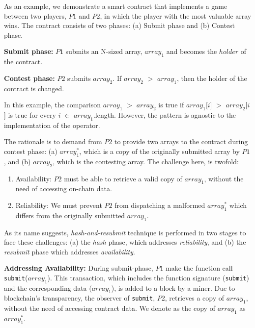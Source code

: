 

As an example, we demonstrate a smart contract that implements a game between
two players, $P1$ and $P2$, in which the player with the most valuable array
wins. The contract consists of two phases: (a) Submit phase and (b) Contest
phase.

\noindent \textbf{Submit
phase:} $P1$ submits an N-sized array, $array_1$ and becomes the
$holder$ of the contract.

\noindent \textbf{Contest phase:} $P2$ submits $array_2$. If $array_2$ $>$
$array_1$, then the holder of the contract is changed.

In this example, the comparison $array_1$ $>$ $array_2$ is true if
$array_1$[$i$] $>$ $array_2$[$i$] is true for every $i$ $\in$ $array_1$.length.
However, the pattern is agnostic to the implementation of the operator.

The rationale is to demand from $P2$ to provide two arrays to the contract
during contest phase: (a) $array_1^*$, which is a copy of the
originally submitted array by $P1$, and (b) $array_2$, which is the
contesting array. The challenge here, is twofold:

\begin{enumerate}

    \item Availability: $P2$ must be able to retrieve a valid copy of
        $array_1$, without the need of accessing on-chain data.

    \item Reliability: We must prevent $P2$ from dispatching a malformed
        $array_1^*$ which differs from the originally submitted $array_1$.

\end{enumerate}

As its name suggests, \emph{hash-and-resubmit} technique is performed in two
stages to face these challenges: (a) the \emph{hash} phase, which addresses
\emph{reliability}, and (b) the \emph{resubmit} phase which addresses
\emph{availability}.

\noindent \textbf{Addressing Availability:} During submit-phase, $P1$ make the
function call \texttt{submit}($array_1$). This transaction, which includes the
function signature (\texttt{submit}) and the corresponding data ($array_1$), is
added to a block by a miner.  Due to blockchain's transparency, the observer of
\texttt{submit}, $P2$, retrieves a copy of $array_1$, without the need of
accessing contract data. We denote as the copy of $array_1$ as $array_1^*$.

